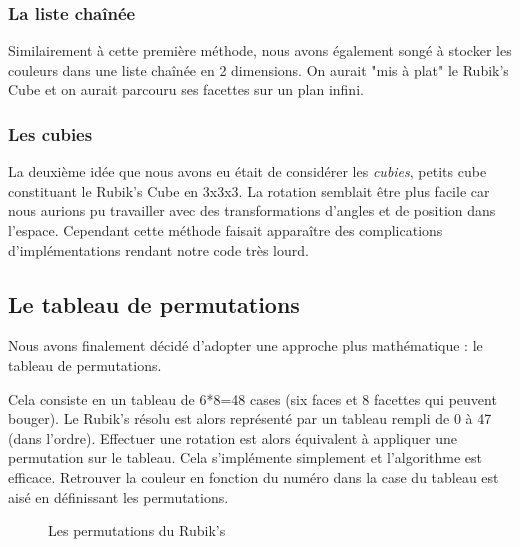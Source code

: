 \subsubsection{La liste chaînée}
Similairement à cette première méthode, nous avons également songé à stocker les couleurs dans une liste chaînée en 2 dimensions.
On aurait "mis à plat" le Rubik's Cube et on aurait parcouru ses facettes sur un plan infini.

\subsubsection{Les cubies}
La deuxième idée que nous avons eu était de considérer les \textit{cubies}, petits cube constituant le Rubik's Cube en 3x3x3.
La rotation semblait être plus facile car nous aurions pu travailler avec des transformations d'angles et de position dans l'espace.
Cependant cette méthode faisait apparaître des complications d'implémentations rendant notre code très lourd.

\subsection{Le tableau de permutations}
Nous avons finalement décidé d'adopter une approche plus mathématique : le tableau de permutations.

Cela consiste en un tableau de 6*8=48 cases (six faces et 8 facettes qui peuvent bouger).
Le Rubik's résolu est alors représenté par un tableau rempli de 0 à 47 (dans l'ordre).
Effectuer une rotation est alors équivalent à appliquer une permutation sur le tableau.
Cela s'implémente simplement et l'algorithme est efficace.
Retrouver la couleur en fonction du numéro dans la case du tableau est aisé en définissant les permutations.

\begin{figure}[h]
\begin{center}
\end{center}
    \caption{Les permutations du Rubik's}
\end{figure}

